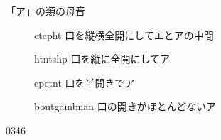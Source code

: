 \documentclass[aspectratio=169,xcolor={dvipsnames,table}]{beamer}
\begin{document}
\begin{frame}[plain]{「ア」の類の母音}
\Large


\begin{description}
 \item[\textipa{/\ae /}] ct\hspace{20pt}cp\hspace{20pt}ht%
\hfill{}{\small 口を縦横全開にしてエとアの中間}
 \item[\textipa{/\textscripta /}] ht\hspace{20pt}nt\hspace{20pt}shp%
\hfill{}{\small 口を縦に全開にしてア}
 \item[\textipa{/\textturnv /}] cp\hspace{20pt}ct\hspace{20pt}nt%
\hfill{}{\small 口を半開きでア}
 \item[\textipa{/\textschwa /}] bout\hspace{20pt}gain\hspace{20pt}bnan%
\hfill{}{\small 口の開きがほとんどないア}
 \end{description}

\hfill{\tiny 0346}\,{\scriptsize {}}
\end{frame}
\end{document}
